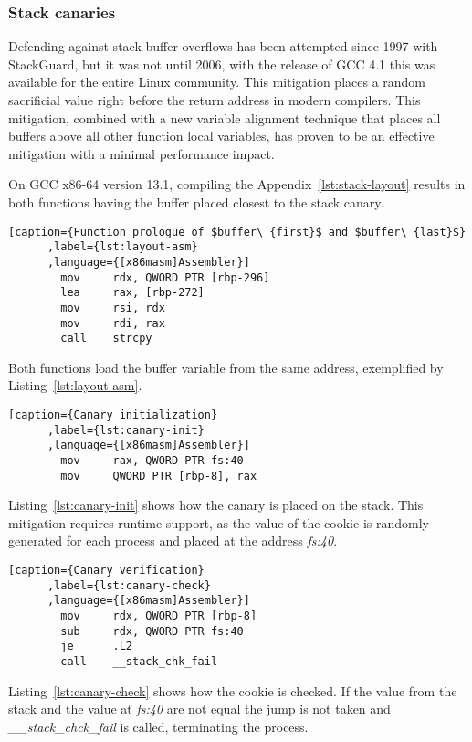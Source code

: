 \documentclass{article}
\begin{document}
\subsubsection{Stack canaries}
Defending against stack buffer overflows has been attempted since 1997 with StackGuard\cite{stackguard}, but it was not until 2006, with the release of GCC 4.1 this was available for the entire Linux community. This mitigation places a random sacrificial value right before the return address in modern compilers. This mitigation, combined with a new variable alignment technique that places all buffers above all other function local variables, has proven to be an effective mitigation with a minimal performance impact.

On GCC x86-64 version 13.1, compiling the Appendix~\ref{lst:stack-layout} results in both functions having the buffer
placed closest to the stack canary.

\begin{lstlisting}[caption={Function prologue of $buffer\_{first}$ and $buffer\_{last}$}
      ,label={lst:layout-asm}
      ,language={[x86masm]Assembler}]
        mov     rdx, QWORD PTR [rbp-296]
        lea     rax, [rbp-272]
        mov     rsi, rdx
        mov     rdi, rax
        call    strcpy
\end{lstlisting}

Both functions load the buffer variable from the same address, exemplified by Listing~\ref{lst:layout-asm}.

\begin{lstlisting}[caption={Canary initialization}
      ,label={lst:canary-init}
      ,language={[x86masm]Assembler}]
        mov     rax, QWORD PTR fs:40
        mov     QWORD PTR [rbp-8], rax
\end{lstlisting}

Listing~\ref{lst:canary-init} shows how the canary is placed on the stack. This mitigation requires runtime support, as the value of the cookie is randomly generated for each process and placed at the address \emph{fs:40}.

\begin{lstlisting}[caption={Canary verification}
      ,label={lst:canary-check}
      ,language={[x86masm]Assembler}]
        mov     rdx, QWORD PTR [rbp-8]
        sub     rdx, QWORD PTR fs:40
        je      .L2
        call    __stack_chk_fail
\end{lstlisting}

Listing~\ref{lst:canary-check} shows how the cookie is checked. If the value from the stack and the value at \emph{fs:40} are not equal the jump is not taken and \emph{\_\_stack\_chck\_fail} is called, terminating the process.
\end{document}

